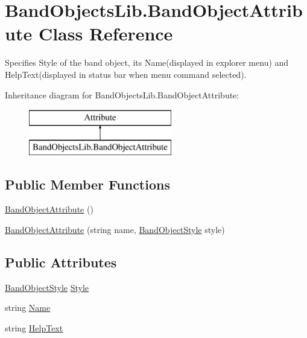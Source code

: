 \hypertarget{class_band_objects_lib_1_1_band_object_attribute}{\section{Band\+Objects\+Lib.\+Band\+Object\+Attribute Class Reference}
\label{class_band_objects_lib_1_1_band_object_attribute}
}


Specifies Style of the band object, its Name(displayed in explorer menu) and Help\+Text(displayed in status bar when menu command selected).  


Inheritance diagram for Band\+Objects\+Lib.\+Band\+Object\+Attribute\+:\begin{figure}[H]
\begin{center}
\leavevmode
\includegraphics[height=2.000000cm]{class_band_objects_lib_1_1_band_object_attribute}
\end{center}
\end{figure}
\subsection*{Public Member Functions}
\begin{DoxyCompactItemize}
\item 
\hyperlink{class_band_objects_lib_1_1_band_object_attribute_a6171715ecac83a71fa70db0c94633538}{Band\+Object\+Attribute} ()
\item 
\hyperlink{class_band_objects_lib_1_1_band_object_attribute_ab422c34ace091509082213733dd7d72b}{Band\+Object\+Attribute} (string name, \hyperlink{namespace_band_objects_lib_a27f3f2f266615c311d6a3ac052c2462c}{Band\+Object\+Style} style)
\end{DoxyCompactItemize}
\subsection*{Public Attributes}
\begin{DoxyCompactItemize}
\item 
\hyperlink{namespace_band_objects_lib_a27f3f2f266615c311d6a3ac052c2462c}{Band\+Object\+Style} \hyperlink{class_band_objects_lib_1_1_band_object_attribute_ab086fd13146611067913baf79ad1b8be}{Style}
\item 
string \hyperlink{class_band_objects_lib_1_1_band_object_attribute_a4f24365158ed7f6c429e54410b38edbf}{Name}
\item 
string \hyperlink{class_band_objects_lib_1_1_band_object_attribute_a4ea2e87e2eae8922abd8b509c0f7596c}{Help\+Text}
\end{DoxyCompactItemize}


